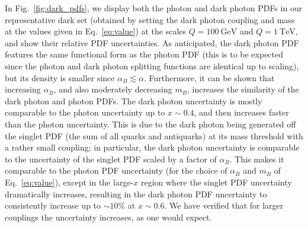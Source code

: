 \documentclass[withindex,glossary]{cam-thesis}
\begin{document}
In Fig.~\ref{fig:dark_pdfs}, we display both the photon and dark
photon PDFs in our representative dark set (obtained by setting the
dark photon coupling and mass at the values given in
Eq.~\eqref{eq:value}) at the scales $Q = 100\ \text{GeV}$ and $Q=1\ \text{TeV}$,
and show their relative PDF uncertainties. As anticipated, the dark photon PDF features 
the same functional form as the photon PDF (this is to be expected
since the photon and dark photon splitting functions are identical up
to scaling), but its density is smaller since $\alpha_B \lesssim
\alpha$. Furthermore, it can be shown that increasing $\alpha_B$, and also moderately decreasing 
$m_B$, increases the similarity of the dark photon and photon PDFs.
The dark photon uncertainty is mostly comparable to the photon
uncertainty up to $x\sim 0.4$, and then increases faster than the photon
uncertainty. This is due to the dark photon being generated off the
singlet PDF (the sum of all quarks and antiquarks) at its mass
threshold with a rather small coupling; in particular, the dark
photon uncertainty is comparable to the uncertainty of the singlet PDF
scaled by a factor of  $\alpha_B$. This makes it comparable to the
photon PDF uncertainty (for the choice of $\alpha_B$ and $m_B$ of
Eq.~\eqref{eq:value}), except in the large-$x$ region where the singlet PDF uncertainty dramatically increases,
resulting in the dark photon PDF uncertainty to consistently increase up to $\sim10\%$ at
$x\sim 0.6$. We have verified that for larger couplings the
uncertainty increases, as one would expect. 
\end{document}
